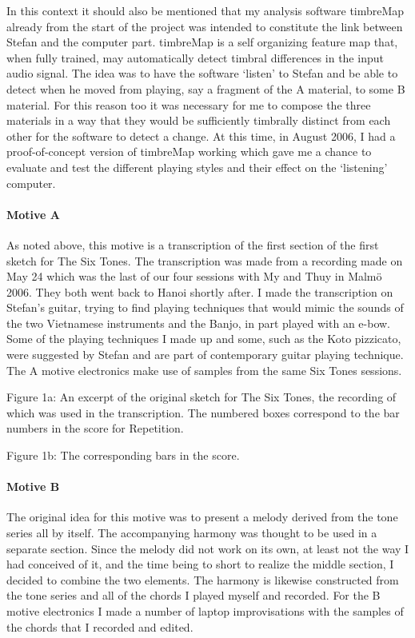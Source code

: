 In this context it should also be mentioned that my analysis software
timbreMap already from the start of the project was intended to
constitute the link between Stefan and the computer part. timbreMap is
a self organizing feature map that, when fully trained, may
automatically detect timbral differences in the input audio
signal. The idea was to have the software `listen' to Stefan and be
able to detect when he moved from playing, say a fragment of the A
material, to some B material. For this reason too it was necessary for
me to compose the three materials in a way that they would be
sufficiently timbrally distinct from each other for the software to
detect a change. At this time, in August 2006, I had a
proof-of-concept version of timbreMap working which gave me a chance
to evaluate and test the different playing styles and their effect on
the `listening' computer.

\paragraph{Motive A }
\label{sec:motive-}

As noted above, this motive is a transcription of the first section of
the first sketch for The Six Tones. The transcription was made from a
recording made on May 24 which was the last of our four sessions with
My and Thuy in Malm\"{o} 2006. They both went back to Hanoi shortly
after. I made the transcription on Stefan's guitar, trying to find
playing techniques that would mimic the sounds of the two Vietnamese
instruments and the Banjo, in part played with an e-bow. Some of the
playing techniques I made up and some, such as the Koto pizzicato,
were suggested by Stefan and are part of contemporary guitar playing
technique. The A motive electronics make use of samples from the same
Six Tones sessions.

Figure 1a: An excerpt of the original sketch for The Six Tones, the
recording of which was used in the transcription. The numbered boxes
correspond to the bar numbers in the score for Repetition.


Figure 1b: The corresponding bars in the score.
 
\paragraph{Motive B}
\label{sec:motive-b-1}


The original idea for this motive was to present a melody derived from
the tone series all by itself. The accompanying harmony was thought to
be used in a separate section. Since the melody did not work on its
own, at least not the way I had conceived of it, and the time being to
short to realize the middle section, I decided to combine the two
elements. The harmony is likewise constructed from the tone series and
all of the chords I played myself and recorded. For the B motive
electronics I made a number of laptop improvisations with the samples
of the chords that I recorded and edited.

